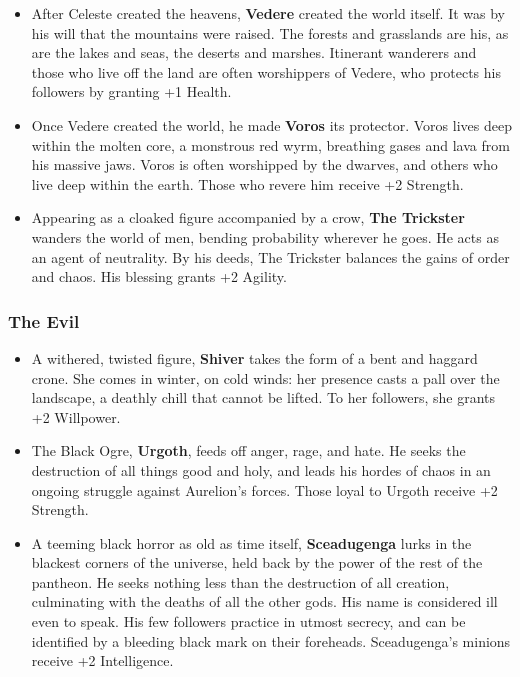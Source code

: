 \begin{itemize}
\item After Celeste created the heavens, {\bf Vedere} created the world 
itself.  It was by his will that the mountains were raised.  The forests 
and grasslands are his, as are the lakes and seas, the deserts and 
marshes.  Itinerant wanderers and those who live off the land are often 
worshippers of Vedere, who protects his followers by granting +1 Health.

\item Once Vedere created the world, he made {\bf Voros} its protector.  
Voros lives deep within the molten core, a monstrous red wyrm, breathing 
gases and lava from his massive jaws.  Voros is often worshipped by the 
dwarves, and others who live deep within the earth.  Those who revere him 
receive +2 Strength.

\item Appearing as a cloaked figure accompanied by a crow, 
{\bf The Trickster} wanders the world of men, bending probability wherever 
he goes.  He acts as an agent of neutrality.  By his deeds, The Trickster 
balances the gains of order and chaos.  His blessing grants +2 Agility.
\end{itemize}

\subsubsection{The Evil}

\begin{itemize}
\item A withered, twisted figure, {\bf Shiver} takes the form of a bent and
haggard crone.  She comes in winter, on cold winds: her presence casts a 
pall over the landscape, a deathly chill that cannot be lifted.  To her 
followers, she grants +2 Willpower. 

\item The Black Ogre, {\bf Urgoth}, feeds off anger, rage, and hate.  He 
seeks the destruction of all things good and holy, and leads his hordes of 
chaos in an ongoing struggle against Aurelion's forces.  Those loyal to 
Urgoth receive +2 Strength.

\item A teeming black horror as old as time itself, {\bf Sceadugenga} lurks
in the blackest corners of the universe, held back by the power of the rest
of the pantheon.  He seeks nothing less than the destruction of all 
creation, culminating with the deaths of all the other gods.  His name is 
considered ill even to speak.  His few followers practice in utmost 
secrecy, and can be identified by a bleeding black mark on their 
foreheads.  Sceadugenga's minions receive +2 Intelligence.

\end{itemize}

